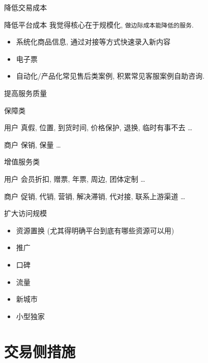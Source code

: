 \documentclass[presentation,bigger]{beamer}
\begin{document}
\begin{frame}{降低交易成本}
\framebreak


\begin{exampleblock}{降低平台成本}
我觉得核心在于规模化, \texttt{做边际成本能降低的服务}.
\begin{itemize}
\item 系统化商品信息, 通过对接等方式快速录入新内容
\item 电子票
\item 自动化/产品化常见售后类案例, 积累常见客服案例自助咨询.
\end{itemize}
\end{exampleblock}
\end{frame}


\begin{frame}[label={sec:orgc0ed51d}]{提高服务质量}
\begin{block}{保障类}
\begin{block}{用户}
真假, 位置, 到货时间, 价格保护, 退换, 临时有事不去 \dots{}
\end{block}
\begin{block}{商户}
保销, 保量 \dots{}
\end{block}
\end{block}
\begin{block}{增值服务类}
\begin{block}{用户}
会员折扣, 赠票, 年票, 周边, 团体定制 \dots{}
\end{block}

\begin{block}{商户}
促销, 代销, 营销, 解决滞销, 代对接, 联系上游渠道 \dots{}
\end{block}
\end{block}
\end{frame}

\begin{frame}[label={sec:org53a8662}]{扩大访问规模}
\begin{itemize}
\item 资源置换 (尤其得明确平台到底有哪些资源可以用)
\item 推广
\item 口碑
\item 流量
\item 新城市
\item 小型独家
\end{itemize}
\end{frame}


\section{交易侧措施}
\label{sec:org7c38b07}
\end{document}
